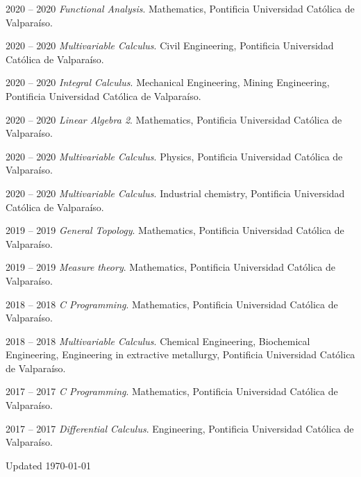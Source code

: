 \documentclass[12pt,letterpaper]{report}
\begin{document}
    \begin{tablist}

        \item[2020 -- 2020] \tab \emph{Functional Analysis}. Mathematics, Pontificia Universidad Cat\'olica de Valpara\'iso. 
            
        \item[2020 -- 2020] \tab \emph{Multivariable Calculus}. Civil Engineering, Pontificia Universidad Cat\'olica de Valpara\'iso. 
            
        \item[2020 -- 2020] \tab \emph{Integral Calculus}. Mechanical Engineering, Mining Engineering, Pontificia Universidad Cat\'olica de Valpara\'iso. 
            
        \item[2020 -- 2020] \tab \emph{Linear Algebra 2}. Mathematics, Pontificia Universidad Cat\'olica de Valpara\'iso.
            
        \item[2020 -- 2020] \tab \emph{Multivariable Calculus}. Physics, Pontificia Universidad Cat\'olica de Valpara\'iso. 
            
        \item[2020 -- 2020] \tab \emph{Multivariable Calculus}. Industrial chemistry, Pontificia Universidad Cat\'olica de Valpara\'iso. 
        
        \item[2019 -- 2019] \tab \emph{General Topology}. Mathematics, Pontificia Universidad Cat\'olica de Valpara\'iso. 
            
        \item[2019 -- 2019] \tab \emph{Measure theory}. Mathematics, Pontificia Universidad Cat\'olica de Valpara\'iso. 
            
        \item[2018 -- 2018] \tab \emph{C Programming}. Mathematics, Pontificia Universidad Cat\'olica de Valpara\'iso. 
            
        \item[2018 -- 2018] \tab \emph{Multivariable Calculus}. Chemical Engineering, Biochemical Engineering, Engineering in extractive metallurgy, Pontificia Universidad Cat\'olica de Valpara\'iso. 
         

        \item[2017 -- 2017] \tab \emph{C Programming}. Mathematics, Pontificia Universidad Cat\'olica de Valpara\'iso. 
            
        \item[2017 -- 2017] \tab \emph{Differential Calculus}. Engineering, Pontificia Universidad Cat\'olica de Valpara\'iso. 

    \end{tablist}
    \begin{center}
        \vfill
        Updated \monthyeardate\today
    \end{center}
\end{document}
